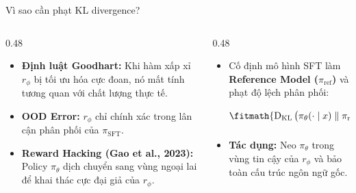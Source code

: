 \begin{frame}{Vì sao cần phạt KL divergence?}
  \begin{columns}[T,onlytextwidth]
    \begin{column}{0.48\textwidth}
      \small
      \begin{itemize}\setlength{\itemsep}{4pt}
        \item \textbf{Định luật Goodhart:} Khi hàm xấp xỉ $r_\phi$ bị tối ưu hóa cực đoan, nó mất tính tương quan với chất lượng thực tế.
        \item \textbf{OOD Error:} $r_\phi$ chỉ chính xác trong lân cận phân phối của $\pi_{\text{SFT}}$.
        \item \textbf{Reward Hacking (Gao et al., 2023):} Policy $\pi_\theta$ dịch chuyển sang vùng ngoại lai để khai thác cực đại giả của $r_\phi$.
      \end{itemize}
    \end{column}
    \begin{column}{0.48\textwidth}
      \small
      \begin{itemize}\setlength{\itemsep}{4pt}
        \item Cố định mô hình SFT làm \textbf{Reference Model ($\pi_{\text{ref}}$)} và phạt độ lệch phân phối:
          \[
            \fitmath{%
            \DKL\big(\pi_\theta(\cdot \mid x) \parallel \pi_{\text{ref}}(\cdot \mid x)\big) = \E_{y \sim \pi_\theta} \left[ \log \frac{\pi_\theta(y \mid x)}{\pi_{\text{ref}}(y \mid x)} \right]
            }
          \]
        \item \textbf{Tác dụng:} Neo $\pi_\theta$ trong vùng tin cậy của $r_\phi$ và bảo toàn cấu trúc ngôn ngữ gốc.
      \end{itemize}
    \end{column}
  \end{columns}
  \par\vspace{0pt}
\end{frame}

